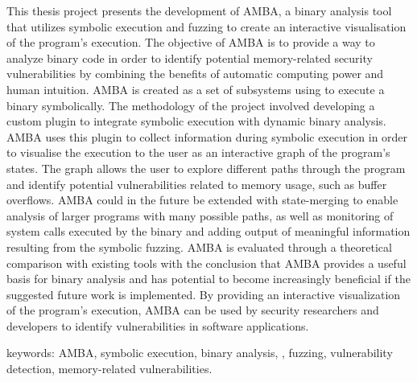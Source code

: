
This thesis project presents the development of AMBA, a binary analysis tool
that utilizes symbolic execution and fuzzing to create an interactive
visualisation of the program's execution. The objective of AMBA is to provide a
way to analyze binary code in order to identify potential memory-related
security vulnerabilities by combining the benefits of automatic computing power
and human intuition. AMBA is created as a set of subsystems using \stoe{} to
execute a binary symbolically. The methodology of the project involved
developing a custom \stoe{} plugin to integrate symbolic execution with dynamic
binary analysis. AMBA uses this plugin to collect information during symbolic
execution in order to visualise the execution to the user as an interactive
graph of the program's states. The graph allows the user to explore different
paths through the program and identify potential vulnerabilities related to
memory usage, such as buffer overflows. AMBA could in the future be extended
with state-merging to enable analysis of larger programs with many possible
paths, as well as monitoring of system calls executed by the binary and adding
output of meaningful information resulting from the symbolic fuzzing. AMBA is
evaluated through a theoretical comparison with existing tools with the
conclusion that AMBA provides a useful basis for binary analysis and has
potential to become increasingly beneficial if the suggested future work is
implemented. By providing an interactive visualization of the program's
execution, AMBA can be used by security researchers and developers to identify
vulnerabilities in software applications.


keywords: AMBA, symbolic execution, binary analysis, \stoe{},
fuzzing, vulnerability detection, memory-related vulnerabilities.
